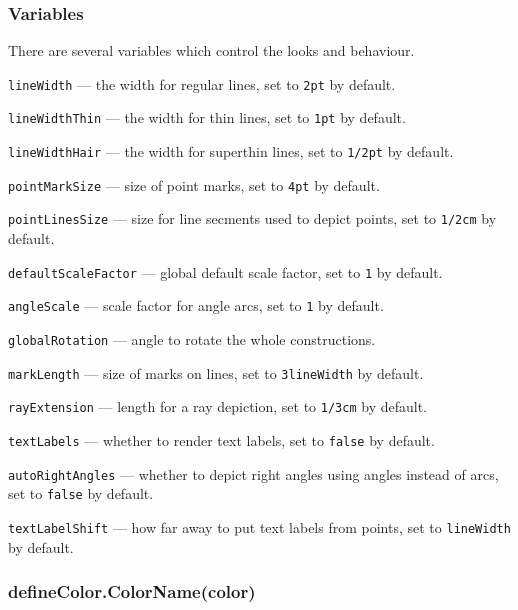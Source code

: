 \documentclass{ltxdoc}
\begin{document}
\subsubsection{Variables}\label{Variable}
	
	There are several variables which control the looks and behaviour.
	
	\texttt{lineWidth} — the width for regular lines, set to \texttt{2pt} by default.
	
	\texttt{lineWidthThin} — the width for thin lines, set to \texttt{1pt} by default.
	
	\texttt{lineWidthHair} — the width for superthin lines, set to \texttt{1/2pt} by default.
	
	\texttt{pointMarkSize} — size of point marks, set to \texttt{4pt} by default.
	
	\texttt{pointLinesSize} — size for line secments used to depict points, set to \texttt{1/2cm} by default.

	\texttt{defaultScaleFactor} — global default scale factor, set to \texttt{1} by default.
	
	\texttt{angleScale} — scale factor for angle arcs, set to \texttt{1} by default.

	\texttt{globalRotation} — angle to rotate the whole constructions.

	\texttt{markLength} — size of marks on lines, set to \texttt{3lineWidth} by default.

	\texttt{rayExtension} — length for a ray depiction, set to \texttt{1/3cm} by default.

	
	\texttt{textLabels} — whether to render text labels, set to \texttt{false} by default.


	\texttt{autoRightAngles} — whether to depict right angles using angles instead of arcs, set to \texttt{false} by default.

	
	\texttt{textLabelShift} — how far away to put text labels from points, set to \texttt{lineWidth} by default.
	


\subsubsection{defineColor.ColorName(color)}\label{defineColor}
	
\end{document}
